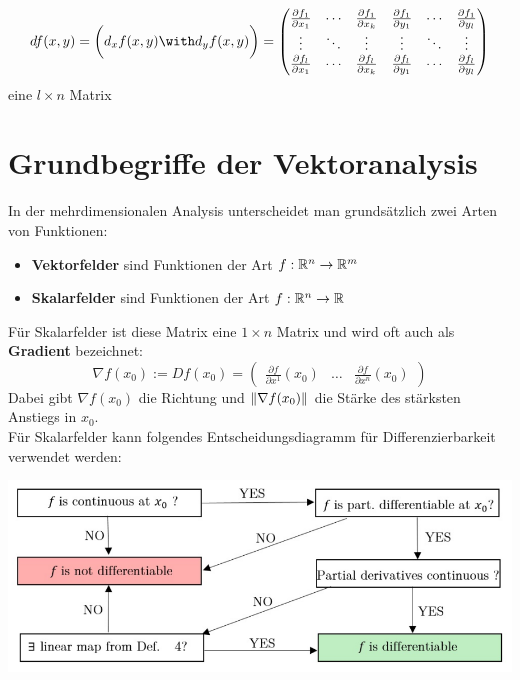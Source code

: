 \begin{remark}
    $$ df(x,y) = \bigg(d_x f(x,y) \with d_y f(x,y) \bigg) = \begin{pmatrix}
    \frac{\partial f_1}{\partial x_1} & \cdots & \frac{\partial f_1}{\partial x_k} & 
    \frac{\partial f_1}{\partial y_1} & \cdots & \frac{\partial f_1}{\partial y_l} \\ 
    \vdots & \ddots & \vdots & \vdots & \ddots & \vdots \\
    \frac{\partial f_l}{\partial x_1} & \cdots & \frac{\partial f_l}{\partial x_k} & 
    \frac{\partial f_l}{\partial y_1} & \cdots & \frac{\partial f_l}{\partial y_l}
    \end{pmatrix} $$
    eine $l \times n$ Matrix
\end{remark}

\section{Grundbegriffe der Vektoranalysis}

\begin{remark}
    In der mehrdimensionalen Analysis unterscheidet man grundsätzlich zwei Arten von Funktionen:
    \begin{itemize}
        \item \textbf{Vektorfelder} sind Funktionen der Art $f: \mathbb{R}^n \to \mathbb{R}^m$
        \item \textbf{Skalarfelder} sind Funktionen der Art $f: \mathbb{R}^n \to \mathbb{R}$
    \end{itemize}
    Für Skalarfelder ist diese Matrix eine $1\times n$ Matrix und wird oft auch als \textbf{Gradient} bezeichnet:
    $$ \nabla f(x_0) := Df(x_0) = \begin{pmatrix}
    \frac{\partial f}{\partial x^1}(x_0) & \dots & \frac{\partial f}{\partial x^n}(x_0)
    \end{pmatrix} $$
    Dabei gibt $\nabla f(x_0)$ die Richtung und $\lVert \nabla f(x_0)\rVert$ die Stärke des stärksten Anstiegs in $x_0$.\\
    Für Skalarfelder kann folgendes Entscheidungsdiagramm für Differenzierbarkeit verwendet werden:
    \begin{center}
        \includegraphics[scale=0.3]{img/diff.png}
    \end{center}
\end{remark}

